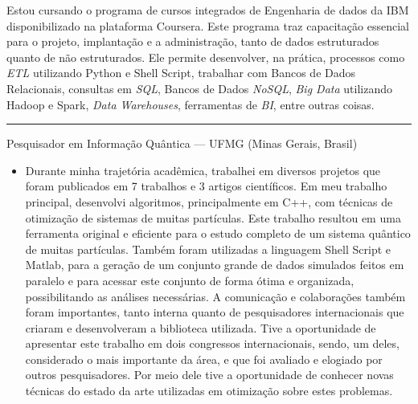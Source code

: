 \documentclass[a4paper,10pt]{article}
\newlength{\cvcolumngapwidth}
\newlength{\cvleftcolumnwidth}
\newlength{\cvrightcolumnwidth}
\newcommand{\cvsectionstyle}[1]{{\normalsize\cvsectionfont\textcolor{cvsectioncolor}{#1}}}
\newcommand{\cvtitlestyle}[1]{{\normalsize\cvtitlefont\textcolor{cvtitlecolor}{#1}}}
\newcommand{\cvdurationstyle}[1]{{\normalsize\cvdurationfont\textcolor{cvdurationcolor}{#1}}}
\newlength{\cvafteritemskipamount}
\newlength{\cvaftersectionskipamount}
\newlength{\cvaftertitleskipamount}
\newlength{\cvparskip}
\newcommand{\cvsection}[1]{
    \begin{minipage}[t]{\cvleftcolumnwidth}
        \raggedleft\cvsectionstyle{#1}
    \end{minipage}%
    \hspace{\cvcolumngapwidth}%
    \begin{minipage}[t]{\cvrightcolumnwidth}
        \textcolor{cvrulecolor}{\rule{\cvrightcolumnwidth}{0.5mm}}
    \end{minipage}
    \vspace{\cvaftersectionskipamount}}
\newcommand{\cvitem}[2]{
    \begin{minipage}[t]{\cvleftcolumnwidth}
        \raggedleft #1
    \end{minipage}%
    \hspace{\cvcolumngapwidth}%
    \begin{minipage}[t]{\cvrightcolumnwidth}
        \setlength{\parskip}{\cvparskip} #2
    \end{minipage}
    \vspace{\cvafteritemskipamount}}
\newcommand{\cvtitle}[1]{
    \cvtitlestyle{#1}
    \vspace{\cvaftertitleskipamount}
    \vspace{-\cvparskip}}
\begin{document}
{\begin{itemize}[leftmargin=*]
        Estou cursando o programa de cursos integrados de Engenharia de dados da IBM disponibilizado na plataforma Coursera. 
        Este programa traz capacitação essencial para o projeto, implantação e a administração, tanto de dados estruturados quanto de não estruturados. 
        Ele permite desenvolver, na prática, processos como \textit{ETL} utilizando Python e Shell Script, trabalhar com Bancos de Dados Relacionais, 
        consultas em \textit{SQL}, Bancos de Dados \textit{NoSQL}, \textit{Big Data} utilizando Hadoop e Spark, \textit{Data Warehouses},
        ferramentas de \textit{BI}, entre outras coisas.
        \end{itemize}
    }

\newpage
\cvsection{Experiência Profissional}
\cvitem{\cvdurationstyle{2014 - Presente}}
    {\cvtitle{Pesquisador em Informação Quântica --- UFMG (Minas Gerais, Brasil)}
    
    \begin{itemize}[leftmargin=*]
        \vspace{0.2cm}
        
        \item Durante minha trajetória acadêmica, trabalhei em diversos projetos que foram publicados em 7 trabalhos e 3 artigos científicos. 
        Em meu trabalho principal, desenvolvi algoritmos, principalmente em C++, com técnicas de otimização de sistemas de muitas partículas. 
        Este trabalho resultou em uma ferramenta original e eficiente para o estudo completo de um sistema quântico de muitas partículas. 
        Também foram utilizadas a linguagem Shell Script e Matlab, para a geração de um conjunto grande de dados simulados feitos em paralelo 
        e para acessar este conjunto de forma ótima e organizada, possibilitando as análises necessárias. 
        A comunicação e colaborações também foram importantes, tanto interna quanto de pesquisadores internacionais que criaram e desenvolveram a biblioteca utilizada.
        \newline\newline
        Tive a oportunidade de apresentar este trabalho em dois congressos internacionais, sendo, um deles, considerado o mais importante da área, 
        e que foi avaliado e elogiado por outros pesquisadores. 
        Por meio dele tive a oportunidade de conhecer novas técnicas do estado da arte utilizadas em otimização sobre estes problemas.
        \newline\newline
        

\end{itemize}}
\end{document}
